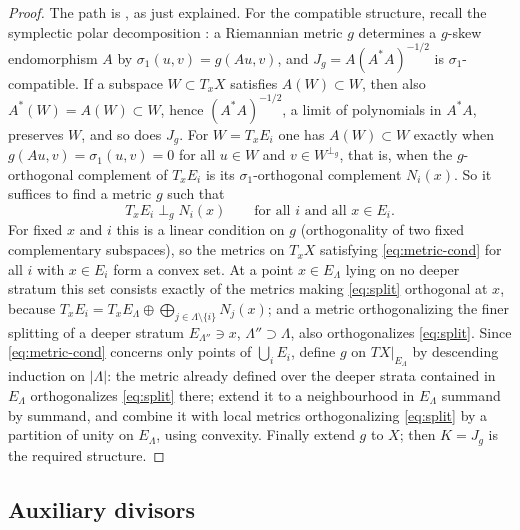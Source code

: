 \documentclass[11pt]{article}
\theoremstyle{remark}
\begin{document}
\begin{proof}
The path is \cite[Theorem 2.13]{FMZ}, as just explained. For the
compatible structure, recall the symplectic polar decomposition
\cite[proof of Theorem 2.16]{Wendl}: a Riemannian metric $g$ determines
a $g$-skew endomorphism $A$ by $\sigma_1(u,v)=g(Au,v)$, and
$J_g=A(A^*A)^{-1/2}$ is $\sigma_1$-compatible. If a subspace
$W\subset T_xX$ satisfies $A(W)\subset W$, then also
$A^*(W)=A(W)\subset W$, hence $(A^*A)^{-1/2}$, a limit of polynomials in
$A^*A$, preserves $W$, and so does $J_g$. For $W=T_xE_i$ one has
$A(W)\subset W$ exactly
when $g(Au,v)=\sigma_1(u,v)=0$ for all $u\in W$ and $v\in W^{\perp_g}$,
that is, when the $g$-orthogonal complement of $T_xE_i$ is its
$\sigma_1$-orthogonal complement $N_i(x)$. So it suffices to find a
metric $g$ such that
\begin{equation}\label{eq:metric-cond}
 T_xE_i\perp_g N_i(x)\qquad\text{for all }i\text{ and all }x\in E_i.
\end{equation}
For fixed $x$ and $i$ this is a linear condition on $g$ (orthogonality
of two fixed complementary subspaces), so the metrics on $T_xX$
satisfying \eqref{eq:metric-cond} for all $i$ with $x\in E_i$ form a
convex set. At a point $x\in E_\Lambda$ lying on no deeper stratum this
set consists exactly of the metrics making \eqref{eq:split} orthogonal
at $x$, because
$T_xE_i=T_xE_\Lambda\oplus\bigoplus_{j\in\Lambda\setminus\{i\}}N_j(x)$;
and a metric orthogonalizing the finer splitting of a deeper stratum
$E_{\Lambda''}\ni x$, $\Lambda''\supset\Lambda$, also orthogonalizes
\eqref{eq:split}. Since \eqref{eq:metric-cond} concerns only points of
$\bigcup_iE_i$, define $g$ on $TX|_{E_\Lambda}$ by descending induction
on $|\Lambda|$: the metric already defined over the deeper strata
contained in $E_\Lambda$ orthogonalizes \eqref{eq:split} there; extend
it to a neighbourhood in $E_\Lambda$ summand by summand, and combine it
with local metrics orthogonalizing \eqref{eq:split} by a partition of
unity on $E_\Lambda$, using convexity. Finally extend $g$ to $X$; then
$K=J_g$ is the required structure.
\end{proof}

\subsection{Auxiliary divisors}
\end{document}
